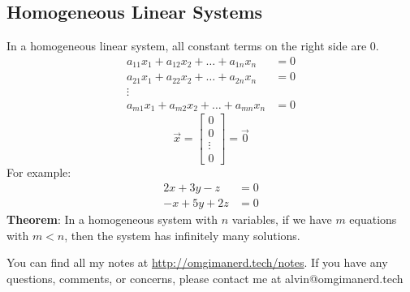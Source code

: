 \documentclass{math}
\begin{document}
\subsection*{Homogeneous Linear Systems}
In a homogeneous linear system, all constant terms on the right side are 0.
\begin{align*}
  a_{11}x_1+a_{12}x_2+\dots+a_{1n}x_n &= 0 \\
  a_{21}x_1+a_{22}x_2+\dots+a_{2n}x_n &= 0 \\
  \vdots \\
  a_{m1}x_1+a_{m2}x_2+\dots+a_{mn}x_n &= 0
\end{align*}
\[ \vec{x} = \begin{bmatrix}0 \\ 0 \\ \vdots \\ 0\end{bmatrix} = \vec{0} \]
For example:
\begin{align*}
  2x+3y-z &= 0 \\
  -x+5y+2z &= 0
\end{align*}
\textbf{Theorem}: In a homogeneous system with \( n \) variables, if we have
\( m \) equations with \( m < n \), then the system has infinitely many
solutions.

\begin{center}
  You can find all my notes at \url{http://omgimanerd.tech/notes}. If you have
  any questions, comments, or concerns, please contact me at
  alvin@omgimanerd.tech
\end{center}
\end{document}
